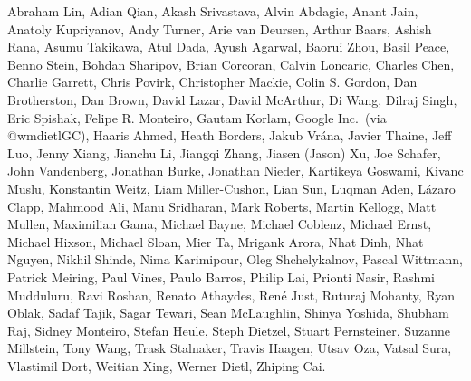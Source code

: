 Abraham Lin,
Adian Qian,
Akash Srivastava,
Alvin Abdagic,
Anant Jain,
Anatoly Kupriyanov,
Andy Turner,
Arie van Deursen,
Arthur Baars,
Ashish Rana,
Asumu Takikawa,
Atul Dada,
Ayush Agarwal,
Baorui Zhou,
Basil Peace,
Benno Stein,
Bohdan Sharipov,
Brian Corcoran,
Calvin Loncaric,
Charles Chen,
Charlie Garrett,
Chris Povirk,
Christopher Mackie,
Colin S. Gordon,
Dan Brotherston,
Dan Brown,
David Lazar,
David McArthur,
Di Wang,
Dilraj Singh,
Eric Spishak,
Felipe R. Monteiro,
Gautam Korlam,
Google Inc.\ (via @wmdietlGC),
Haaris Ahmed,
Heath Borders,
Jakub Vr\'ana,
Javier Thaine,
Jeff Luo,
Jenny Xiang,
Jianchu Li,
Jiangqi Zhang,
Jiasen (Jason) Xu,
Joe Schafer,
John Vandenberg,
Jonathan Burke,
Jonathan Nieder,
Kartikeya Goswami,
Kivanc Muslu,
Konstantin Weitz,
Liam Miller-Cushon,
Lian Sun,
Luqman Aden,
L\'azaro Clapp,
Mahmood Ali,
Manu Sridharan,
Mark Roberts,
Martin Kellogg,
Matt Mullen,
Maximilian Gama,
Michael Bayne,
Michael Coblenz,
Michael Ernst,
Michael Hixson,
Michael Sloan,
Mier Ta,
Mrigank Arora,
Nhat Dinh,
Nhat Nguyen,
Nikhil Shinde,
Nima Karimipour,
Oleg Shchelykalnov,
Pascal Wittmann,
Patrick Meiring,
Paul Vines,
Paulo Barros,
Philip Lai,
Prionti Nasir,
Rashmi Mudduluru,
Ravi Roshan,
Renato Athaydes,
Ren\'e Just,
Ruturaj Mohanty,
Ryan Oblak,
Sadaf Tajik,
Sagar Tewari,
Sean McLaughlin,
Shinya Yoshida,
Shubham Raj,
Sidney Monteiro,
Stefan Heule,
Steph Dietzel,
Stuart Pernsteiner,
Suzanne Millstein,
Tony Wang,
Trask Stalnaker,
Travis Haagen,
Utsav Oza,
Vatsal Sura,
Vlastimil Dort,
Weitian Xing,
Werner Dietl,
Zhiping Cai.
